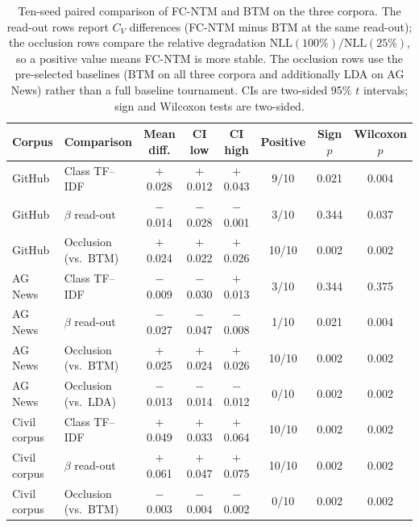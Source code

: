 \documentclass[Journal,letterpaper,NoLists]{ascelike-new}
\newcommand{\fcntm}{FC-NTM}
\begin{document}
\begin{table}[t]
\centering
\caption{Ten-seed paired comparison of \fcntm{} and BTM on the three corpora. The read-out rows report $C_V$ differences (\fcntm{} minus BTM at the same read-out); the occlusion rows compare the relative degradation $\mathrm{NLL}(100\%)/\mathrm{NLL}(25\%)$, so a positive value means \fcntm{} is more stable. The occlusion rows use the pre-selected baselines (BTM on all three corpora and additionally LDA on AG News) rather than a full baseline tournament. CIs are two-sided 95\% $t$ intervals; sign and Wilcoxon tests are two-sided.}
\label{tab:seed-paired}
\footnotesize
\setlength{\tabcolsep}{3pt}
\begin{tabular}{@{}llcccccc@{}}
\toprule
Corpus & Comparison & Mean diff. & CI low & CI high & Positive & Sign $p$ & Wilcoxon $p$ \\
\midrule
GitHub & Class TF--IDF & $+$0.028 & $+$0.012 & $+$0.043 & 9/10 & 0.021 & 0.004 \\
GitHub & $\beta$ read-out & $-$0.014 & $-$0.028 & $-$0.001 & 3/10 & 0.344 & 0.037 \\
GitHub & Occlusion (vs.\ BTM) & $+$0.024 & $+$0.022 & $+$0.026 & 10/10 & 0.002 & 0.002 \\
\midrule
AG News & Class TF--IDF & $-$0.009 & $-$0.030 & $+$0.013 & 3/10 & 0.344 & 0.375 \\
AG News & $\beta$ read-out & $-$0.027 & $-$0.047 & $-$0.008 & 1/10 & 0.021 & 0.004 \\
AG News & Occlusion (vs.\ BTM) & $+$0.025 & $+$0.024 & $+$0.026 & 10/10 & 0.002 & 0.002 \\
AG News & Occlusion (vs.\ LDA) & $-$0.013 & $-$0.014 & $-$0.012 & 0/10 & 0.002 & 0.002 \\
\midrule
Civil corpus & Class TF--IDF & $+$0.049 & $+$0.033 & $+$0.064 & 10/10 & 0.002 & 0.002 \\
Civil corpus & $\beta$ read-out & $+$0.061 & $+$0.047 & $+$0.075 & 10/10 & 0.002 & 0.002 \\
Civil corpus & Occlusion (vs.\ BTM) & $-$0.003 & $-$0.004 & $-$0.002 & 0/10 & 0.002 & 0.002 \\
\bottomrule
\end{tabular}
\end{table}
\end{document}
